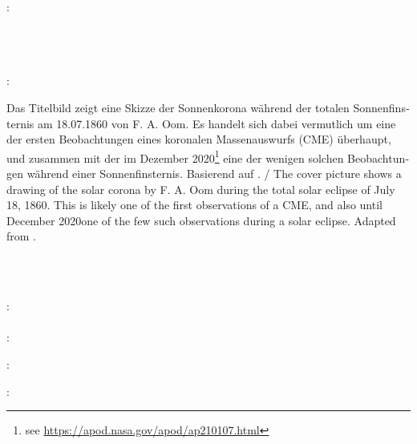 \thispagestyle{empty}

\hfill

\vfill

\noindent\myName:\\
\textit{\myTitle \\ \mySubtitle} \\%
\textcopyright\ \myTime

\vspace{1cm}

\noindent{}: \\[2mm]
\begin{minipage}{\textwidth}
\renewcommand{\thempfootnote}{\arabic{mpfootnote}}
{\footnotesize \foreignlanguage{ngerman}{Das Titelbild zeigt eine Skizze der Sonnenkorona während der totalen Sonnenfinsternis am 18.07.1860 von F. A. Oom. Es handelt sich dabei vermutlich um eine der ersten Beobachtungen eines koronalen Massenauswurfs (\acs{CME}) überhaupt, und zusammen mit der im Dezember 2020\footnote{see \url{https://apod.nasa.gov/apod/ap210107.html}} eine der wenigen solchen Beobachtungen während einer Sonnenfinsternis. Basierend auf \citet[S. 551]{Ranyard-1879}.}  /
The cover picture shows a drawing of the solar corona by F. A. Oom during the total solar eclipse of July 18, 1860. This is likely one of the first observations of a \ac{CME}, and also until December 2020\footnotemark[1] one of the few such observations during a solar eclipse. Adapted from \citet[page 551]{Ranyard-1879}.}
\end{minipage}\\\

\vspace{1cm}

\noindent{}: \\
\myProf \\

\noindent{}: \\
\myOtherProf


\vspace{1cm}

\noindent{}: \\
\myExamDate

\bigskip

\noindent{}: \\

\vspace{1cm}

